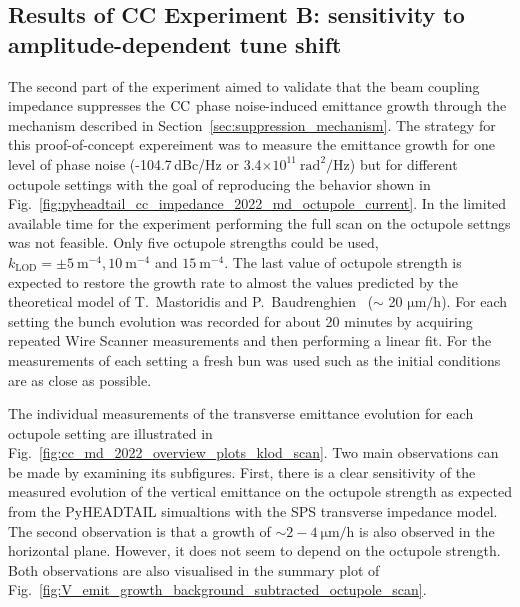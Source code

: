 \subsection{Results of CC Experiment B: sensitivity to amplitude-dependent tune shift}\label{subsec:cc_md_2022_octupole_scan}

The second part of the experiment aimed to validate that the beam coupling impedance suppresses the ${\mathrm{CC}}$ phase noise-induced emittance growth through the mechanism described in Section~\ref{sec:suppression_mechanism}. The strategy for this proof-of-concept expereiment was to measure the emittance growth for one level of phase noise (-104.7\,dBc/Hz or 3.4$\times 10^{11} \ \mathrm{rad^2/Hz}$) but for different octupole settings with the goal of reproducing the behavior shown in Fig.~\ref{fig:pyheadtail_cc_impedance_2022_md_octupole_current}. In the limited available time for the experiment performing the full scan on the octupole settngs was not feasible. Only five octupole strengths could be used, $k_\mathrm{LOD} = \pm 5 \ \mathrm{m^{-4}}, 10 \ \mathrm{m^{-4}}$ and $15 \ \mathrm{m^{-4}}$. The last value of octupole strength is expected to restore the growth rate to almost the values predicted by the theoretical model of T.~Mastoridis and P.~Baudrenghien~\cite{PhysRevSTAB.18.101001} ($\sim$ 20 $\mathrm{\mu m/h}$). For each setting the bunch evolution was recorded for about 20 minutes by acquiring repeated Wire Scanner measurements and then performing a linear fit. For the measurements of each setting a fresh bun was used such as the initial conditions are as close as possible. 

The individual measurements of the transverse emittance evolution for each octupole setting are illustrated in Fig.~\ref{fig:cc_md_2022_overview_plots_klod_scan}. Two main observations can be made by examining its subfigures. First, there is a clear sensitivity of the measured evolution of the vertical emittance on the octupole strength as expected from the PyHEADTAIL simualtions with the SPS transverse impedance model. The second observation is that a growth of $\sim 2-4 \ \mathrm{\mu m/h}$ is also observed in the horizontal plane. However, it does not seem to depend on the octupole strength. Both observations are also visualised in the summary plot of Fig.~\ref{fig:V_emit_growth_background_subtracted_octupole_scan}.

